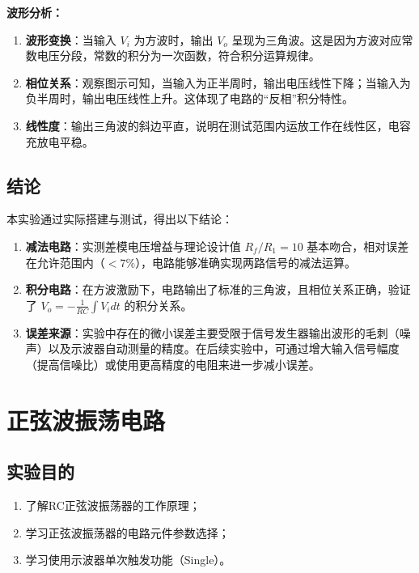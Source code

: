 \documentclass[UTF8, a4paper]{ctexrep} %
\begin{document}
\textbf{波形分析：}
\begin{enumerate}
    \item \textbf{波形变换}：当输入 $V_i$ 为方波时，输出 $V_o$ 呈现为三角波。这是因为方波对应常数电压分段，常数的积分为一次函数，符合积分运算规律。
    \item \textbf{相位关系}：观察图示可知，当输入为正半周时，输出电压线性下降；当输入为负半周时，输出电压线性上升。这体现了电路的“反相”积分特性。
    \item \textbf{线性度}：输出三角波的斜边平直，说明在测试范围内运放工作在线性区，电容充放电平稳。
\end{enumerate}

\section{结论}

本实验通过实际搭建与测试，得出以下结论：
\begin{enumerate}
    \item \textbf{减法电路}：实测差模电压增益与理论设计值 $R_f/R_1 = 10$ 基本吻合，相对误差在允许范围内（$<7\%$），电路能够准确实现两路信号的减法运算。
    \item \textbf{积分电路}：在方波激励下，电路输出了标准的三角波，且相位关系正确，验证了 $V_o = -\frac{1}{RC}\int V_i dt$ 的积分关系。
    \item \textbf{误差来源}：实验中存在的微小误差主要受限于信号发生器输出波形的毛刺（噪声）以及示波器自动测量的精度。在后续实验中，可通过增大输入信号幅度（提高信噪比）或使用更高精度的电阻来进一步减小误差。
\end{enumerate}





\chapter{正弦波振荡电路} \label{sec:exp5_title_4}

\section{实验目的} \label{subsec:purpose_4}
\begin{enumerate}
    \item 了解RC正弦波振荡器的工作原理；
    \item 学习正弦波振荡器的电路元件参数选择；
    \item 学习使用示波器单次触发功能（Single）。
\end{enumerate}
\end{document}
